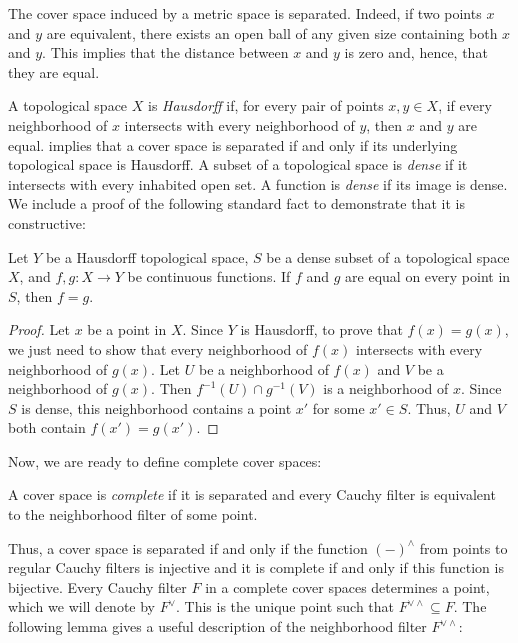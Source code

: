 \documentclass[reqno]{amsart}
\theoremstyle{definition}
\theoremstyle{remark}
\numberwithin{figure}{section}
\begin{document}
\begin{example}
The cover space induced by a metric space is separated.
Indeed, if two points $x$ and $y$ are equivalent, there exists an open ball of any given size containing both $x$ and $y$.
This implies that the distance between $x$ and $y$ is zero and, hence, that they are equal.
\end{example}

A topological space $X$ is \emph{Hausdorff} if, for every pair of points $x,y \in X$, if every neighborhood of $x$ intersects with every neighborhood of $y$, then $x$ and $y$ are equal.
 implies that a cover space is separated if and only if its underlying topological space is Hausdorff.
A subset of a topological space is \emph{dense} if it intersects with every inhabited open set.
A function is \emph{dense} if its image is dense.
We include a proof of the following standard fact to demonstrate that it is constructive:

\begin{prop}
Let $Y$ be a Hausdorff topological space, $S$ be a dense subset of a topological space $X$, and $f,g : X \to Y$ be continuous functions.
If $f$ and $g$ are equal on every point in $S$, then $f = g$.
\end{prop}
\begin{proof}
Let $x$ be a point in $X$.
Since $Y$ is Hausdorff, to prove that $f(x) = g(x)$, we just need to show that every neighborhood of $f(x)$ intersects with every neighborhood of $g(x)$.
Let $U$ be a neighborhood of $f(x)$ and $V$ be a neighborhood of $g(x)$.
Then $f^{-1}(U) \cap g^{-1}(V)$ is a neighborhood of $x$.
Since $S$ is dense, this neighborhood contains a point $x'$ for some $x' \in S$.
Thus, $U$ and $V$ both contain $f(x') = g(x')$.
\end{proof}

Now, we are ready to define complete cover spaces:

\begin{defn}
A cover space is \emph{complete} if it is separated and every Cauchy filter is equivalent to the neighborhood filter of some point.
\end{defn}

Thus, a cover space is separated if and only if the function $(-)^\wedge$ from points to regular Cauchy filters is injective and it is complete if and only if this function is bijective.
Every Cauchy filter $F$ in a complete cover spaces determines a point, which we will denote by $F^\vee$.
This is the unique point such that $F^{\vee \wedge} \subseteq F$.
The following lemma gives a useful description of the neighborhood filter $F^{\vee \wedge}$:
\end{document}

